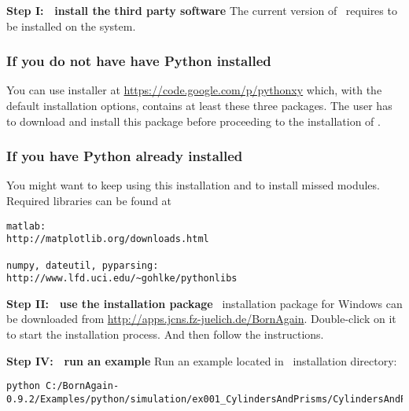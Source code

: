 \noindent
{\bf Step I: $~$ install the third party software} \newline
The current version of \BornAgain\ requires  
to be installed on the system. 

\subsubsection{If you do not have have Python installed}
You can use  installer
at \url{https://code.google.com/p/pythonxy} which, with the default installation options, contains at least these three packages.
The user has to download and install this package before proceeding to
the installation of \BornAgain.
\vspace*{2mm}


\subsubsection{If you have Python already installed}
You might want to keep using this installation and to install missed modules.
Required libraries can be found at
\begin{lstlisting}[language=shell, style=commandline]
matlab:
http://matplotlib.org/downloads.html

numpy, dateutil, pyparsing:
http://www.lfd.uci.edu/~gohlke/pythonlibs
\end{lstlisting}


\noindent
{\bf Step II: $~$ use the installation package } \newline
\BornAgain\ installation package for Windows can be downloaded from \url{http://apps.jcns.fz-juelich.de/BornAgain}.
Double-click on it to start the installation process. And then follow the instructions.
\vspace*{2mm}

\noindent
{\bf Step IV: $~$ run an example} \newline
Run an example located in \BornAgain\ installation directory:
\begin{lstlisting}[language=shell, style=commandline]
python C:/BornAgain-0.9.2/Examples/python/simulation/ex001_CylindersAndPrisms/CylindersAndPrisms.py
\end{lstlisting}





